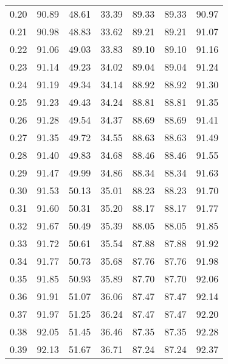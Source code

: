 \begin{tabular}{|c|c|c|c|c|c|c|}
      0.20 &     90.89 &     48.61 &      33.39 &   89.33 &      89.33 &         90.97 \\
      0.21 &     90.98 &     48.83 &      33.62 &   89.21 &      89.21 &         91.07 \\
      0.22 &     91.06 &     49.03 &      33.83 &   89.10 &      89.10 &         91.16 \\
      0.23 &     91.14 &     49.23 &      34.02 &   89.04 &      89.04 &         91.24 \\
      0.24 &     91.19 &     49.34 &      34.14 &   88.92 &      88.92 &         91.30 \\
      0.25 &     91.23 &     49.43 &      34.24 &   88.81 &      88.81 &         91.35 \\
      0.26 &     91.28 &     49.54 &      34.37 &   88.69 &      88.69 &         91.41 \\
      0.27 &     91.35 &     49.72 &      34.55 &   88.63 &      88.63 &         91.49 \\
      0.28 &     91.40 &     49.83 &      34.68 &   88.46 &      88.46 &         91.55 \\
      0.29 &     91.47 &     49.99 &      34.86 &   88.34 &      88.34 &         91.63 \\
      0.30 &     91.53 &     50.13 &      35.01 &   88.23 &      88.23 &         91.70 \\
      0.31 &     91.60 &     50.31 &      35.20 &   88.17 &      88.17 &         91.77 \\
      0.32 &     91.67 &     50.49 &      35.39 &   88.05 &      88.05 &         91.85 \\
      0.33 &     91.72 &     50.61 &      35.54 &   87.88 &      87.88 &         91.92 \\
      0.34 &     91.77 &     50.73 &      35.68 &   87.76 &      87.76 &         91.98 \\
      0.35 &     91.85 &     50.93 &      35.89 &   87.70 &      87.70 &         92.06 \\
      0.36 &     91.91 &     51.07 &      36.06 &   87.47 &      87.47 &         92.14 \\
      0.37 &     91.97 &     51.25 &      36.24 &   87.47 &      87.47 &         92.20 \\
      0.38 &     92.05 &     51.45 &      36.46 &   87.35 &      87.35 &         92.28 \\
      0.39 &     92.13 &     51.67 &      36.71 &   87.24 &      87.24 &         92.37 \\

\end{tabular}
